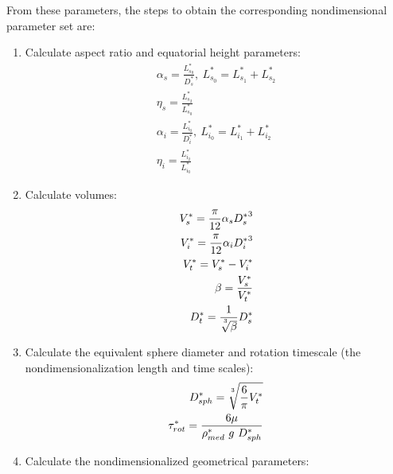 \documentclass[10pt,a4paper]{article}
\def\non{\nonumber}
\begin{document}
From these parameters, the steps to obtain the corresponding nondimensional parameter set are:
\begin{enumerate}
	\item Calculate aspect ratio and equatorial height parameters:
	\begin{eqnarray}\label{d2ndpars1}
		\alpha_s = \frac{L^*_{s_0}}{D^*_s}, ~ L^*_{s_0} = L^*_{s_1} + L^*_{s_2} \non \\
		\eta_s = \frac{L^*_{s_2}}{L^*_{s_0}} \non \\
		\alpha_{i} = \frac{L^*_{i_0}}{D^*_i}, ~ L^*_{i_0} = L^*_{i_1} + L^*_{i_2} \non \\
		\eta_{i} = \frac{L^*_{i_2}}{L^*_{i_0}}
	\end{eqnarray}
	\item Calculate volumes:
	\begin{eqnarray}\label{d2ndpars2}
		V_s^* = \frac{\pi}{12} \alpha_s {D_s^*}^3 \non \\
		V_i^* = \frac{\pi}{12} \alpha_i {D_i^*}^3 \non \\
		V_t^* = V_s^* - V_i^* \non \\
		\beta = \frac{V_s^*}{V_t^*} \non \\
		D_t^* = \frac{1}{\sqrt[\uproot{5}3]{\beta}} D_s^*
	\end{eqnarray}
	\item Calculate the equivalent sphere diameter and rotation timescale (the nondimensionalization length and time scales):
	\begin{eqnarray}\label{d2ndpars3}
		D_{sph}^* = \sqrt[\uproot{5}3]{\frac{6}{\pi} V_t^*} \non \\
		\tau^*_{rot} = \frac{6 \mu}{\rho^*_{med} ~ g ~ D_{sph}^*}
	\end{eqnarray}
	\item Calculate the nondimensionalized geometrical parameters:

\end{enumerate}
\end{document}
